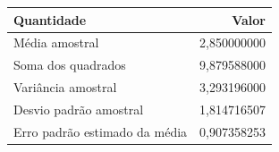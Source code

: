 \begin{tabular}{lr}
\toprule
Quantidade & Valor \\
\midrule
Média amostral & 2,850000000 \\
Soma dos quadrados & 9,879588000 \\
Variância amostral & 3,293196000 \\
Desvio padrão amostral & 1,814716507 \\
Erro padrão estimado da média & 0,907358253 \\
\bottomrule
\end{tabular}
